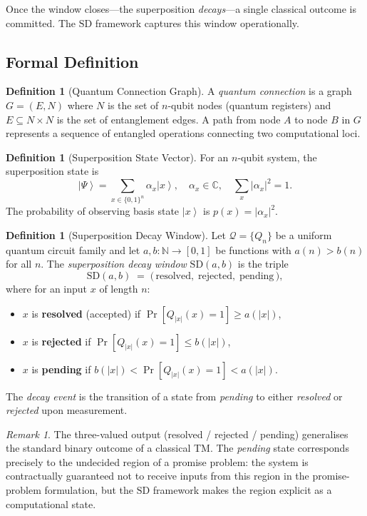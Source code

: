 \documentclass[11pt]{article}
\theoremstyle{plain}
\theoremstyle{definition}
\newtheorem{definition}[theorem]{Definition}
\theoremstyle{remark}
\newtheorem{remark}[theorem]{Remark}
\newcommand{\ket}[1]{\left| #1 \right\rangle}
\newcommand{\SD}{\ensuremath{\mathrm{SD}}}   %
\newcommand{\QC}{\ensuremath{\mathcal{Q}}}   %
\newcommand{\Nat}{\mathbb{N}}
\newcommand{\Complex}{\mathbb{C}}
\begin{document}
Once the window closes---the superposition \emph{decays}---a single classical
outcome is committed.  The \SD{} framework captures this window operationally.

\subsection{Formal Definition}

\begin{definition}[Quantum Connection Graph]
  A \emph{quantum connection} is a graph $G = (E, N)$ where $N$ is the set
  of $n$-qubit nodes (quantum registers) and $E \subseteq N \times N$ is the
  set of entanglement edges.  A path from node $A$ to node $B$ in $G$
  represents a sequence of entangled operations connecting two computational
  loci.
\end{definition}

\begin{definition}[Superposition State Vector]
  For an $n$-qubit system, the superposition state is
  \[
    \ket{\Psi} = \sum_{x \in \{0,1\}^n} \alpha_x \ket{x},
    \quad \alpha_x \in \Complex, \quad \sum_{x} |\alpha_x|^2 = 1.
  \]
  The probability of observing basis state $\ket{x}$ is $p(x) = |\alpha_x|^2$.
\end{definition}

\begin{definition}[Superposition Decay Window]
  \label{def:sdwindow}
  Let $\QC = \{Q_n\}$ be a uniform quantum circuit family and let
  $a, b : \Nat \to [0,1]$ be functions with $a(n) > b(n)$ for all $n$.
  The \emph{superposition decay window} $\SD(a, b)$ is the triple
  \[
    \SD(a, b) \;=\; \bigl(\, \text{resolved},\; \text{rejected},\; \text{pending} \,\bigr),
  \]
  where for an input $x$ of length $n$:
  \begin{itemize}
    \item $x$ is \textbf{resolved} (accepted) if $\Pr[Q_{|x|}(x) = 1] \geq a(|x|)$,
    \item $x$ is \textbf{rejected} if $\Pr[Q_{|x|}(x) = 1] \leq b(|x|)$,
    \item $x$ is \textbf{pending} if $b(|x|) < \Pr[Q_{|x|}(x) = 1] < a(|x|)$.
  \end{itemize}
  The \emph{decay event} is the transition of a state from \emph{pending} to
  either \emph{resolved} or \emph{rejected} upon measurement.
\end{definition}

\begin{remark}
  The three-valued output (resolved / rejected / pending) generalises the
  standard binary outcome of a classical TM.  The \emph{pending} state
  corresponds precisely to the undecided region of a promise problem: the
  system is contractually guaranteed not to receive inputs from this region
  in the promise-problem formulation, but the \SD{} framework makes the
  region explicit as a computational state.
\end{remark}
\end{document}
